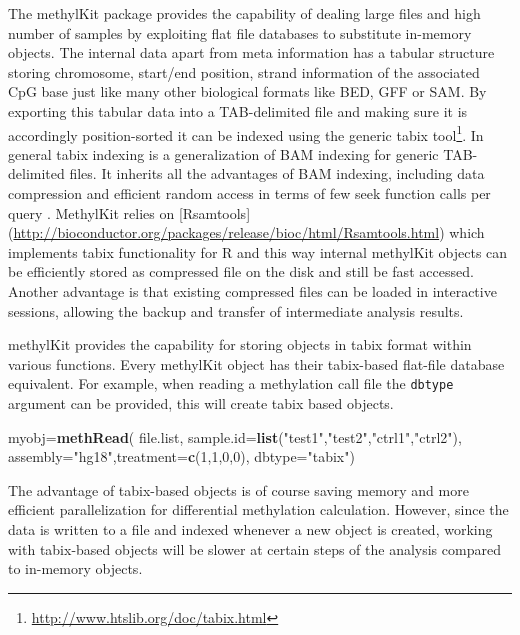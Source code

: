 \documentclass[12pt,]{krantz}
\newenvironment{Shaded}{\begin{snugshade}}{\end{snugshade}}
\newcommand{\DataTypeTok}[1]{\textcolor[rgb]{0.13,0.29,0.53}{#1}}
\newcommand{\DecValTok}[1]{\textcolor[rgb]{0.00,0.00,0.81}{#1}}
\newcommand{\KeywordTok}[1]{\textcolor[rgb]{0.13,0.29,0.53}{\textbf{#1}}}
\newcommand{\NormalTok}[1]{#1}
\newcommand{\StringTok}[1]{\textcolor[rgb]{0.31,0.60,0.02}{#1}}
\renewcommand{\href}[2]{#2\footnote{\url{#1}}}
\begin{document}
The methylKit package provides the capability of dealing large files and high number of samples by exploiting flat file databases to substitute in-memory objects. The internal data apart from meta information has a tabular structure storing chromosome, start/end position, strand information of the associated CpG base just like many other biological formats like BED, GFF or SAM. By exporting this tabular data into a TAB-delimited file and making sure it is accordingly position-sorted it can be indexed using the generic \href{http://www.htslib.org/doc/tabix.html}{tabix tool}. In general tabix indexing is a generalization of BAM indexing for generic TAB-delimited files. It inherits all the advantages of BAM indexing, including data compression and efficient random access in terms of few seek function calls per query \citep{Li2011-wc}. MethylKit relies on {[}Rsamtools{]} (\url{http://bioconductor.org/packages/release/bioc/html/Rsamtools.html}) which implements tabix functionality for R and this way internal methylKit objects can be efficiently stored as compressed file on the disk and still be fast accessed. Another advantage is that existing compressed files can be loaded in interactive sessions, allowing the backup and transfer of intermediate analysis results.

methylKit provides the capability for storing objects in tabix format within various functions. Every methylKit object has their tabix-based flat-file database equivalent. For example, when reading a methylation call file the \texttt{dbtype} argument can be provided, this will create tabix based objects.

\begin{Shaded}
\begin{Highlighting}[]
\NormalTok{ myobj=}\KeywordTok{methRead}\NormalTok{( file.list,}
               \DataTypeTok{sample.id=}\KeywordTok{list}\NormalTok{(}\StringTok{"test1"}\NormalTok{,}\StringTok{"test2"}\NormalTok{,}\StringTok{"ctrl1"}\NormalTok{,}\StringTok{"ctrl2"}\NormalTok{),}
               \DataTypeTok{assembly=}\StringTok{"hg18"}\NormalTok{,}\DataTypeTok{treatment=}\KeywordTok{c}\NormalTok{(}\DecValTok{1}\NormalTok{,}\DecValTok{1}\NormalTok{,}\DecValTok{0}\NormalTok{,}\DecValTok{0}\NormalTok{),}
               \DataTypeTok{dbtype=}\StringTok{"tabix"}\NormalTok{) }
\end{Highlighting}
\end{Shaded}

The advantage of tabix-based objects is of course saving memory and more efficient parallelization for differential methylation calculation. However, since the data is written to a file and indexed whenever a new object is created, working with tabix-based objects will be slower at certain steps of the analysis compared to in-memory objects.
\end{document}
